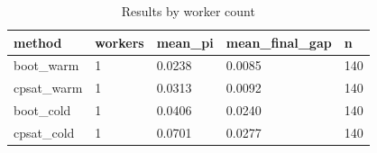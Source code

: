 \begin{table}[t]
\centering
\begin{tabular}{lllll}
\toprule
method & workers & mean\_pi & mean\_final\_gap & n \\
\midrule
boot\_warm & 1 & 0.0238 & 0.0085 & 140 \\
cpsat\_warm & 1 & 0.0313 & 0.0092 & 140 \\
boot\_cold & 1 & 0.0406 & 0.0240 & 140 \\
cpsat\_cold & 1 & 0.0701 & 0.0277 & 140 \\
\bottomrule
\end{tabular}
\caption{Results by worker count}
\label{tab:by-workers}
\end{table}
